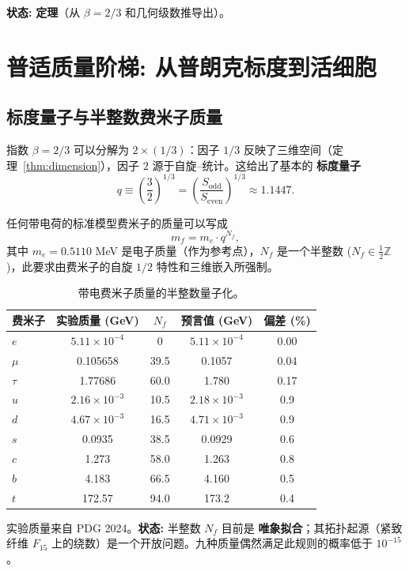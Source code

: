 \documentclass[12pt,a4paper]{article}
\begin{document}
	\textbf{状态:} \textbf{定理}（从 \(\beta = 2/3\) 和几何级数推导出）。
	
	\section{普适质量阶梯: 从普朗克标度到活细胞}
	\label{sec:mass-ladder}
	
	\subsection{标度量子与半整数费米子质量}
	
	指数 \(\beta = 2/3\) 可以分解为 \(2 \times (1/3)\)：因子 \(1/3\) 反映了三维空间（定理~\ref{thm:dimension}），因子 \(2\) 源于自旋–统计。这给出了基本的 \textbf{标度量子}
	\begin{equation}
		q \equiv \left(\frac{3}{2}\right)^{1/3} = \left(\frac{S_{\mathrm{odd}}}{S_{\mathrm{even}}}\right)^{1/3} \approx 1.1447.
	\end{equation}
	
	任何带电荷的标准模型费米子的质量可以写成
	\begin{equation}
		\boxed{m_f = m_e \cdot q^{N_f}},
		\label{eq:mass-quantization}
	\end{equation}
	其中 \(m_e = 0.5110\) MeV 是电子质量（作为参考点），\(N_f\) 是一个半整数 (\(N_f \in \frac{1}{2}\mathbb{Z}\))，此要求由费米子的自旋 \(1/2\) 特性和三维嵌入所强制。
	
	\begin{table}[htbp]
		\centering
		\caption{带电费米子质量的半整数量子化。}
		\label{tab:fermions}
		\begin{tabular}{l c c c c}
			\toprule
			费米子 & 实验质量 (GeV) & \(N_f\) & 预言值 (GeV) & 偏差 (\%) \\
			\midrule
			\(e\)   & \(5.11\times10^{-4}\) & 0      & \(5.11\times10^{-4}\) & 0.00 \\
			\(\mu\)  & 0.105658             & 39.5   & 0.1057               & 0.04 \\
			\(\tau\) & 1.77686              & 60.0   & 1.780                & 0.17 \\
			\(u\)   & \(2.16\times10^{-3}\) & 10.5   & \(2.18\times10^{-3}\) & 0.9 \\
			\(d\)   & \(4.67\times10^{-3}\) & 16.5   & \(4.71\times10^{-3}\) & 0.9 \\
			\(s\)   & 0.0935               & 38.5   & 0.0929               & 0.6 \\
			\(c\)   & 1.273                & 58.0   & 1.263                & 0.8 \\
			\(b\)   & 4.183                & 66.5   & 4.160                & 0.5 \\
			\(t\)   & 172.57               & 94.0   & 173.2                & 0.4 \\
			\bottomrule
		\end{tabular}
		\par\smallskip
		\footnotesize
		实验质量来自 PDG 2024。\textbf{状态:} 半整数 \(N_f\) 目前是 \textbf{唯象拟合}；其拓扑起源（紧致纤维 \(F_{15}\) 上的绕数）是一个开放问题。九种质量偶然满足此规则的概率低于 \(10^{-15}\)。
	\end{table}
	
\end{document}
